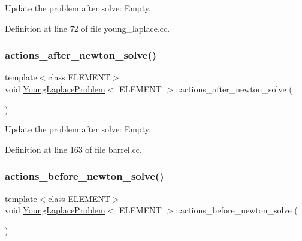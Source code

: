 Update the problem after solve\+: Empty. 



Definition at line 72 of file young\+\_\+laplace.\+cc.

\mbox{\label{classYoungLaplaceProblem_a8eed49ad1c6247cc293a584ab9262efc}} 
\subsubsection{\texorpdfstring{actions\+\_\+after\+\_\+newton\+\_\+solve()}{actions\_after\_newton\_solve()}\hspace{0.1cm}{\footnotesize\ttfamily [2/2]}}
{\footnotesize\ttfamily template$<$class E\+L\+E\+M\+E\+NT$>$ \\
void \hyperlink{classYoungLaplaceProblem}{Young\+Laplace\+Problem}$<$ E\+L\+E\+M\+E\+NT $>$\+::actions\+\_\+after\+\_\+newton\+\_\+solve (\begin{DoxyParamCaption}{ }\end{DoxyParamCaption})\hspace{0.3cm}{\ttfamily [inline]}}



Update the problem after solve\+: Empty. 



Definition at line 163 of file barrel.\+cc.

\mbox{\label{classYoungLaplaceProblem_a93dd45313d28c3b9b0b51e34d14ebd24}} 
\subsubsection{\texorpdfstring{actions\+\_\+before\+\_\+newton\+\_\+solve()}{actions\_before\_newton\_solve()}\hspace{0.1cm}{\footnotesize\ttfamily [1/2]}}
{\footnotesize\ttfamily template$<$class E\+L\+E\+M\+E\+NT$>$ \\
void \hyperlink{classYoungLaplaceProblem}{Young\+Laplace\+Problem}$<$ E\+L\+E\+M\+E\+NT $>$\+::actions\+\_\+before\+\_\+newton\+\_\+solve (\begin{DoxyParamCaption}{ }\end{DoxyParamCaption})}



